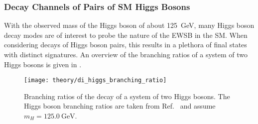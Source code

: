 \subsubsection{Decay Channels of Pairs of SM Higgs Bosons}%

With the observed mass of the Higgs boson of about \SI{125}{\GeV}, many Higgs
boson decay modes are of interest to probe the nature of the EWSB in the
SM. When considering decays of Higgs boson pairs, this results in a plethora of
final states with distinct signatures. An overview of the branching ratios
of a system of two Higgs bosons is given in .

\begin{figure}[htbp]
  \centering

  \texttt{[image: theory/di\_higgs\_branching\_ratio]}

  \caption[Branching ratios of a system of two Higgs bosons.]{Branching
    ratios of the decay of a system of two Higgs bosons. The Higgs boson
    branching ratios are taken from Ref.~\cite{deFlorian:2016spz_book} and
    assume~$m_{H} = \SI{125.0}{\GeV}$.}%
  \label{fig:hh_branching_ratios}
\end{figure}

